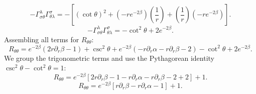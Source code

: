 \documentclass[11pt, a4paper]{report}
\begin{document}
\begin{equation}
-\Gamma^\lambda_{\sigma\theta} \Gamma^\sigma_{\theta\lambda} = -\left[ (\cot\theta)^2 + \left( -re^{-2\beta} \right) \left(\frac{1}{r}\right) + \left(\frac{1}{r}\right) \left( -re^{-2\beta} \right) \right].
\end{equation}
\begin{equation}
-\Gamma^\lambda_{\sigma\theta} \Gamma^\sigma_{\theta\lambda} = -\cot^2\theta + 2e^{-2\beta}.
\end{equation}
Assembling all terms for $R_{\theta\theta}$:
\begin{equation}
R_{\theta\theta} = e^{-2\beta} \left( 2r\partial_r\beta - 1 \right) + \csc^2\theta + e^{-2\beta} \left( -r\partial_r\alpha - r\partial_r\beta - 2 \right) - \cot^2\theta + 2e^{-2\beta}.
\end{equation}
We group the trigonometric terms and use the Pythagorean identity $\csc^2\theta - \cot^2\theta = 1$:
\begin{equation}
R_{\theta\theta} = e^{-2\beta} \left[ 2r\partial_r\beta - 1 - r\partial_r\alpha - r\partial_r\beta - 2 + 2 \right] + 1.
\end{equation}
\begin{equation}
R_{\theta\theta} = e^{-2\beta} \left[ r\partial_r\beta - r\partial_r\alpha - 1 \right] + 1.
\end{equation}
\end{document}
